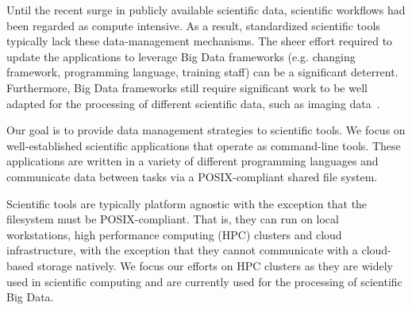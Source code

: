 Until the recent surge in publicly available scientific data, scientific
workflows had been regarded as compute intensive. As a result, standardized
scientific tools typically lack these data-management mechanisms. The sheer
effort required to update the applications to leverage Big Data frameworks
(e.g. changing framework, programming language, training staff) can be a
significant deterrent. Furthermore, Big Data frameworks still require
significant work to be well adapted for the processing of different scientific
data, such as imaging data~\cite{mehta2017comparative}.




% 


Our goal is to provide data management strategies to scientific tools. We focus
on well-established scientific applications that operate as command-line tools.
These applications are written in a variety of different programming languages
and communicate data between tasks via a POSIX-compliant shared file system.

Scientific tools are typically platform agnostic with the exception that the
filesystem must be POSIX-compliant. That is, they can run on local workstations,
high performance computing (HPC) clusters and cloud infrastructure, with the
exception that they cannot communicate with a cloud-based storage natively. We
focus our efforts on HPC clusters as they are widely used in scientific
computing and are currently used for the processing of scientific Big Data.

